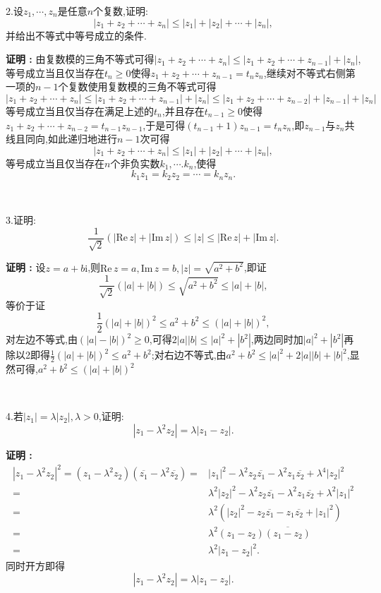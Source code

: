 \documentclass[12pt,fontset=none]{ctexbook}
\newenvironment{proof}[1][]{\par \noindent \textbf{\hspace{2em}证明 \vspace{0.1mm} #1 :}}{\par}
\renewcommand{\i}{\mathrm{i}}
\newcommand{\Lin}[1]{\overline{#1}}
\renewcommand{\rm}[1]{\mathrm{#1}\,}
\begin{document}
2.设$z_{1},\cdots,z_{n}$是任意$n$个复数,证明:
$$|z_{1}+z_{2}+\cdots+z_{n}| \leqslant |z_{1}|+|z_{2}|+\cdots+|z_{n}|,$$
并给出不等式中等号成立的条件.
\begin{proof}
  由复数模的三角不等式可得$|z_{1}+z_{2}+\cdots+z_{n}| \leqslant |z_{1}+z_{2}+\cdots+z_{n-1}|+|z_{n}|$,等号成立当且仅当存在$t_{n} \geqslant 0$使得$z_{1}+z_{2}+\cdots+z_{n-1}=t_{n}z_{n}$,继续对不等式右侧第一项的$n-1$个复数使用复数模的三角不等式可得
  $$|z_{1}+z_{2}+\cdots+z_{n}| \leqslant |z_{1}+z_{2}+\cdots+z_{n-1}|+|z_{n}| \leqslant |z_{1}+z_{2}+\cdots+z_{n-2}|+|z_{n-1}|+|z_{n}|$$
  等号成立当且仅当存在满足上述的$t_{n}$,并且存在$t_{n-1} \geqslant 0$使得$z_{1}+z_{2}+\cdots+z_{n-2}=t_{n-1}z_{n-1}$,于是可得$(t_{n-1}+1)z_{n-1}=t_{n}z_{n}$,即$z_{n-1}$与$z_{n}$共线且同向,如此递归地进行$n-1$次可得
  $$|z_{1}+z_{2}+\cdots+z_{n}| \leqslant |z_{1}|+|z_{2}|+\cdots+|z_{n}|,$$
  等号成立当且仅当存在$n$个非负实数$k_{1},\cdots.k_{n}$,使得
  $$k_{1}z_{1}=k_{2}z_{2}=\cdots=k_{n}z_{n}.$$
\end{proof}

\

3.证明:
$$\frac{1}{\sqrt{2}}(|\rm{Re}z|+|\rm{Im}z|) \leqslant |z| \leqslant |\rm{Re}z|+|\rm{Im} z|.$$
\begin{proof}
    设$z=a+b\i$,则$\rm{Re}z=a,\rm{Im}z=b,|z|=\sqrt{a^{2}+b^{2}}$,即证
    $$\frac{1}{\sqrt{2}}(|a|+|b|) \leqslant \sqrt{a^{2}+b^{2}}\leqslant |a|+|b|,$$
    等价于证
    $$\frac{1}{2}(|a|+|b|)^{2} \leqslant a^{2}+b^{2} \leqslant (|a|+|b|)^{2},$$
    对左边不等式,由$(|a|-|b|)^{2} \geqslant 0$,可得$2|a||b| \leqslant |a|^{2}+|b^{2}|$,两边同时加$ |a|^{2}+|b^{2}|$再除以2即得$\frac{1}{2}(|a|+|b|)^{2} \leqslant a^{2}+b^{2} $;对右边不等式,由$a^{2}+b^{2} \leqslant |a|^{2}+2|a||b|+|b|^{2}$,显然可得,$a^{2}+b^{2} \leqslant (|a|+|b|)^{2}$
\end{proof}

\

4.若$|z_{1}|=\lambda|z_{2}|,\lambda > 0$,证明:
$$|z_{1} - \lambda^{2}z_{2}|=\lambda|z_{1}-z_{2}|.$$
\begin{proof}
    $$
    \begin{aligned}
      |z_{1}-\lambda^{2}z_{2}|^{2}= (z_{1}-\lambda^{2}z_{2})(\Lin{z_{1}}-\lambda^{2}\Lin{z_{2}}) = & |z_{1}|^{2}-\lambda^{2}z_{2}\Lin{z_{1}}-\lambda^{2}z_{1}\Lin{z_{2}}+\lambda^{4}|z_{2}|^{2}\\
      = & \lambda^{2}|z_{2}|^{2}-\lambda^{2}z_{2}\Lin{z_{1}}-\lambda^{2}z_{1}\Lin{z_{2}}+\lambda^{2}|z_{1}|^{2} \\
      = & \lambda^{2}(|z_{2}|^{2}-z_{2}\Lin{z_{1}}-z_{1}\Lin{z_{2}}+|z_{1}|^{2}) \\
      = & \lambda^{2}(z_{1}-z_{2})\Lin{(z_{1}-z_{2})} \\
      = & \lambda^{2}|z_{1}-z_{2}|^{2}.
    \end{aligned}
    $$
    同时开方即得
    $$|z_{1} - \lambda^{2}z_{2}|=\lambda|z_{1}-z_{2}|.$$
\end{proof}
\end{document}

